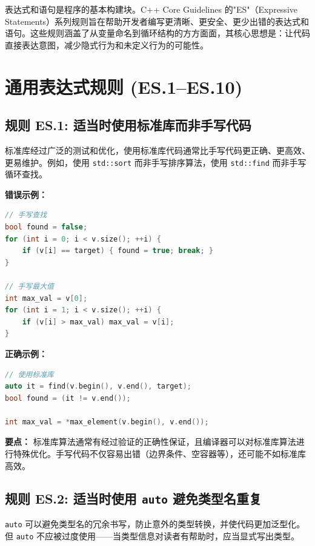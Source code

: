 表达式和语句是程序的基本构建块。C++ Core Guidelines 的"ES"（Expressive Statements）系列规则旨在帮助开发者编写更清晰、更安全、更少出错的表达式和语句。这些规则涵盖了从变量命名到循环结构的方方面面，其核心思想是：让代码直接表达意图，减少隐式行为和未定义行为的可能性。

\section{通用表达式规则 (ES.1--ES.10)}

\subsection*{\textbf{规则 ES.1:} 适当时使用标准库而非手写代码}

标准库经过广泛的测试和优化，使用标准库代码通常比手写代码更正确、更高效、更易维护。例如，使用 \texttt{std::sort} 而非手写排序算法，使用 \texttt{std::find} 而非手写循环查找。

\textbf{错误示例：}

\begin{lstlisting}[language=C++]
// 手写查找
bool found = false;
for (int i = 0; i < v.size(); ++i) {
    if (v[i] == target) { found = true; break; }
}

// 手写最大值
int max_val = v[0];
for (int i = 1; i < v.size(); ++i) {
    if (v[i] > max_val) max_val = v[i];
}
\end{lstlisting}

\textbf{正确示例：}

\begin{lstlisting}[language=C++]
// 使用标准库
auto it = find(v.begin(), v.end(), target);
bool found = (it != v.end());

int max_val = *max_element(v.begin(), v.end());
\end{lstlisting}

\textbf{要点：} 标准库算法通常有经过验证的正确性保证，且编译器可以对标准库算法进行特殊优化。手写代码不仅容易出错（边界条件、空容器等），还可能不如标准库高效。

\subsection*{\textbf{规则 ES.2:} 适当时使用 \texttt{auto} 避免类型名重复}

\texttt{auto} 可以避免类型名的冗余书写，防止意外的类型转换，并使代码更加泛型化。但 \texttt{auto} 不应被过度使用——当类型信息对读者有帮助时，应当显式写出类型。

